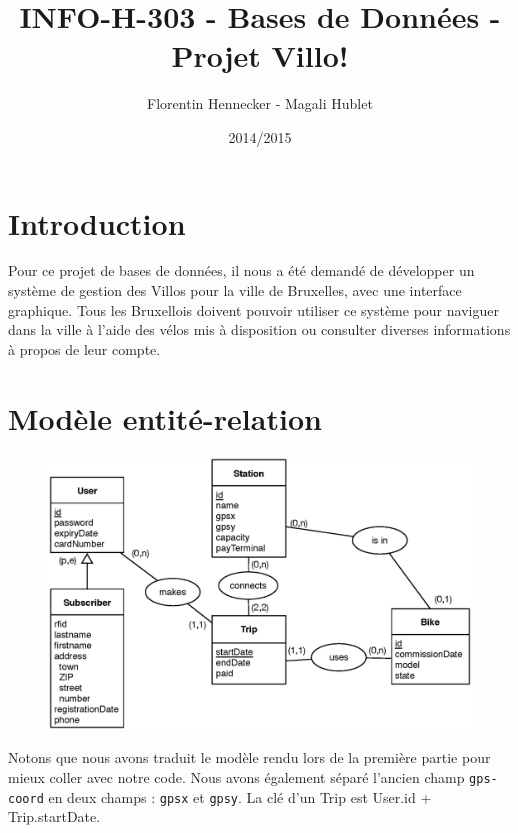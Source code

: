 \documentclass[a4paper]{article}
\title{INFO-H-303 - Bases de Données - Projet Villo!}
\author{Florentin Hennecker - Magali Hublet}
\date{2014/2015}
\begin{document}
\maketitle
\tableofcontents

\section{Introduction}

Pour ce projet de bases de données, il nous a été demandé de développer un système de gestion des Villos pour la ville de Bruxelles, avec une interface graphique. Tous les Bruxellois doivent pouvoir utiliser ce système pour naviguer dans la ville à l'aide des vélos mis à disposition ou consulter diverses informations à propos de leur compte.


\section{Modèle entité-relation}

\begin{figure}[H]
\includegraphics[width=\textwidth]{images/ERSchema.eps}
\end{figure}

Notons que nous avons traduit le modèle rendu lors de la première partie pour mieux coller avec notre code. Nous avons également séparé l'ancien champ \texttt{gps-coord} en deux champs : \texttt{gpsx} et \texttt{gpsy}. La clé d'un Trip est User.id + Trip.startDate.
\end{document}
